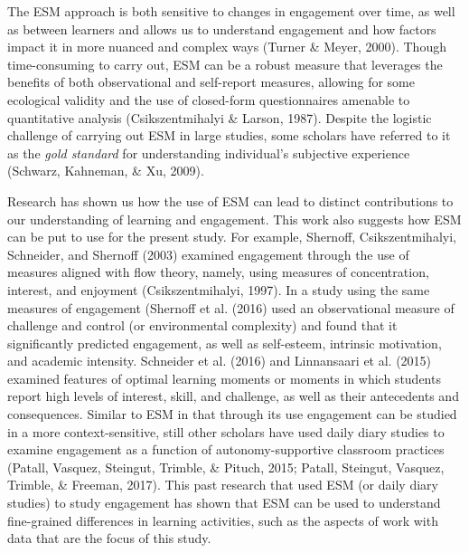 \documentclass[]{book}
\theoremstyle{definition}
\theoremstyle{definition}
\theoremstyle{definition}
\theoremstyle{remark}
\begin{document}
The ESM approach is both sensitive to changes in engagement over time,
as well as between learners and allows us to understand engagement and
how factors impact it in more nuanced and complex ways (Turner \& Meyer,
2000). Though time-consuming to carry out, ESM can be a robust measure
that leverages the benefits of both observational and self-report
measures, allowing for some ecological validity and the use of
closed-form questionnaires amenable to quantitative analysis
(Csikszentmihalyi \& Larson, 1987). Despite the logistic challenge of
carrying out ESM in large studies, some scholars have referred to it as
the \emph{gold standard} for understanding individual's subjective
experience (Schwarz, Kahneman, \& Xu, 2009).

Research has shown us how the use of ESM can lead to distinct
contributions to our understanding of learning and engagement. This work
also suggests how ESM can be put to use for the present study. For
example, Shernoff, Csikszentmihalyi, Schneider, and Shernoff (2003)
examined engagement through the use of measures aligned with flow
theory, namely, using measures of concentration, interest, and enjoyment
(Csikszentmihalyi, 1997). In a study using the same measures of
engagement (Shernoff et al. (2016) used an observational measure of
challenge and control (or environmental complexity) and found that it
significantly predicted engagement, as well as self-esteem, intrinsic
motivation, and academic intensity. Schneider et al. (2016) and
Linnansaari et al. (2015) examined features of optimal learning moments
or moments in which students report high levels of interest, skill, and
challenge, as well as their antecedents and consequences. Similar to ESM
in that through its use engagement can be studied in a more
context-sensitive, still other scholars have used daily diary studies to
examine engagement as a function of autonomy-supportive classroom
practices (Patall, Vasquez, Steingut, Trimble, \& Pituch, 2015; Patall,
Steingut, Vasquez, Trimble, \& Freeman, 2017). This past research that
used ESM (or daily diary studies) to study engagement has shown that ESM
can be used to understand fine-grained differences in learning
activities, such as the aspects of work with data that are the focus of
this study.
\end{document}
